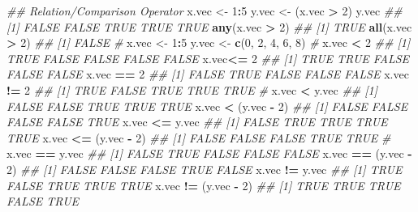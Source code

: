 \documentclass[
]{book}
\newenvironment{Shaded}{\begin{snugshade}}{\end{snugshade}}
\newcommand{\CommentTok}[1]{\textcolor[rgb]{0.56,0.35,0.01}{\textit{#1}}}
\newcommand{\DecValTok}[1]{\textcolor[rgb]{0.00,0.00,0.81}{#1}}
\newcommand{\KeywordTok}[1]{\textcolor[rgb]{0.13,0.29,0.53}{\textbf{#1}}}
\newcommand{\NormalTok}[1]{#1}
\newcommand{\OperatorTok}[1]{\textcolor[rgb]{0.81,0.36,0.00}{\textbf{#1}}}
\newcommand{\StringTok}[1]{\textcolor[rgb]{0.31,0.60,0.02}{#1}}
\begin{document}
\begin{Shaded}
\begin{Highlighting}[]
\CommentTok{\#\# Relation/Comparison Operator}
\NormalTok{x.vec \textless{}{-}}\StringTok{ }\DecValTok{1}\OperatorTok{:}\DecValTok{5}
\NormalTok{y.vec \textless{}{-}}\StringTok{ }\NormalTok{(x.vec }\OperatorTok{\textgreater{}}\StringTok{ }\DecValTok{2}\NormalTok{)}
\NormalTok{y.vec}
\CommentTok{\#\# [1] FALSE FALSE  TRUE  TRUE  TRUE}
\KeywordTok{any}\NormalTok{(x.vec }\OperatorTok{\textgreater{}}\StringTok{ }\DecValTok{2}\NormalTok{)}
\CommentTok{\#\# [1] TRUE}
\KeywordTok{all}\NormalTok{(x.vec }\OperatorTok{\textgreater{}}\StringTok{ }\DecValTok{2}\NormalTok{)}
\CommentTok{\#\# [1] FALSE}
\CommentTok{\#}
\NormalTok{x.vec \textless{}{-}}\StringTok{ }\DecValTok{1}\OperatorTok{:}\DecValTok{5}
\NormalTok{y.vec \textless{}{-}}\StringTok{ }\KeywordTok{c}\NormalTok{(}\DecValTok{0}\NormalTok{, }\DecValTok{2}\NormalTok{, }\DecValTok{4}\NormalTok{, }\DecValTok{6}\NormalTok{, }\DecValTok{8}\NormalTok{)}
\CommentTok{\#}
\NormalTok{x.vec }\OperatorTok{\textless{}}\StringTok{ }\DecValTok{2}
\CommentTok{\#\# [1]  TRUE FALSE FALSE FALSE FALSE}
\NormalTok{x.vec}\OperatorTok{\textless{}=}\StringTok{ }\DecValTok{2}
\CommentTok{\#\# [1]  TRUE  TRUE FALSE FALSE FALSE}
\NormalTok{x.vec }\OperatorTok{==}\StringTok{ }\DecValTok{2}
\CommentTok{\#\# [1] FALSE  TRUE FALSE FALSE FALSE}
\NormalTok{x.vec }\OperatorTok{!=}\StringTok{ }\DecValTok{2}
\CommentTok{\#\# [1]  TRUE FALSE  TRUE  TRUE  TRUE}
\CommentTok{\#}
\NormalTok{x.vec }\OperatorTok{\textless{}}\StringTok{ }\NormalTok{y.vec}
\CommentTok{\#\# [1] FALSE FALSE  TRUE  TRUE  TRUE}
\NormalTok{x.vec }\OperatorTok{\textless{}}\StringTok{ }\NormalTok{(y.vec }\OperatorTok{{-}}\StringTok{ }\DecValTok{2}\NormalTok{)}
\CommentTok{\#\# [1] FALSE FALSE FALSE FALSE  TRUE}
\NormalTok{x.vec }\OperatorTok{\textless{}=}\StringTok{ }\NormalTok{y.vec}
\CommentTok{\#\# [1] FALSE  TRUE  TRUE  TRUE  TRUE}
\NormalTok{x.vec }\OperatorTok{\textless{}=}\StringTok{ }\NormalTok{(y.vec }\OperatorTok{{-}}\StringTok{ }\DecValTok{2}\NormalTok{)}
\CommentTok{\#\# [1] FALSE FALSE FALSE  TRUE  TRUE}
\CommentTok{\#}
\NormalTok{x.vec }\OperatorTok{==}\StringTok{ }\NormalTok{y.vec}
\CommentTok{\#\# [1] FALSE  TRUE FALSE FALSE FALSE}
\NormalTok{x.vec }\OperatorTok{==}\StringTok{ }\NormalTok{(y.vec }\OperatorTok{{-}}\StringTok{ }\DecValTok{2}\NormalTok{)}
\CommentTok{\#\# [1] FALSE FALSE FALSE  TRUE FALSE}
\NormalTok{x.vec }\OperatorTok{!=}\StringTok{ }\NormalTok{y.vec}
\CommentTok{\#\# [1]  TRUE FALSE  TRUE  TRUE  TRUE}
\NormalTok{x.vec }\OperatorTok{!=}\StringTok{ }\NormalTok{(y.vec }\OperatorTok{{-}}\StringTok{ }\DecValTok{2}\NormalTok{)}
\CommentTok{\#\# [1]  TRUE  TRUE  TRUE FALSE  TRUE}
\end{Highlighting}
\end{Shaded}
\end{document}
